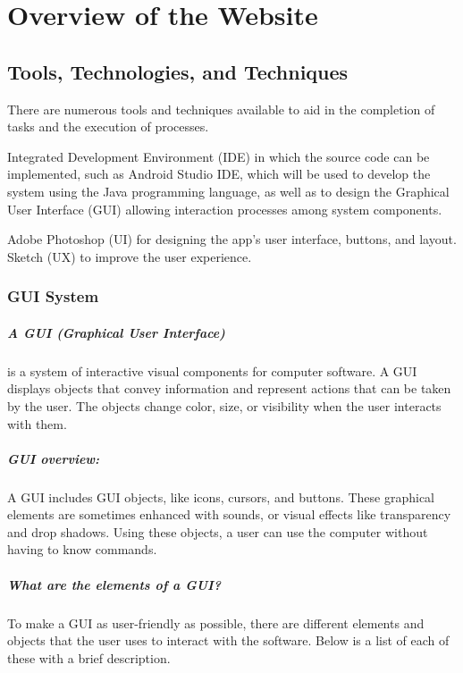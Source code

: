 
\section{Overview of the Website}
\subsection{Tools, Technologies, and Techniques}
 
There are numerous tools and techniques available to aid in the completion of tasks and the execution of processes.

Integrated Development Environment (IDE) in which the source code can be implemented, such as Android Studio IDE, which will be used to develop the system using the Java programming language, as well as to design the Graphical User Interface (GUI) allowing interaction processes among system components.

Adobe Photoshop (UI) for designing the app's user interface, buttons, and layout.
Sketch (UX) to improve the user experience.

\subsubsection{GUI System}

\subparagraph{A GUI (Graphical User Interface)}
 is a system of interactive visual components for computer software. A GUI displays objects that convey information and represent actions that can be taken by the user. The objects change color, size, or visibility when the user interacts with them.

\subparagraph{GUI overview:}
A GUI includes GUI objects, like icons, cursors, and buttons. These graphical elements are sometimes enhanced with sounds, or visual effects like transparency and drop shadows. Using these objects, a user can use the computer without having to know commands.

\subparagraph{What are the elements of a GUI?}
To make a GUI as user-friendly as possible, there are different elements and objects that the user uses to interact with the software. Below is a list of each of these with a brief description.

